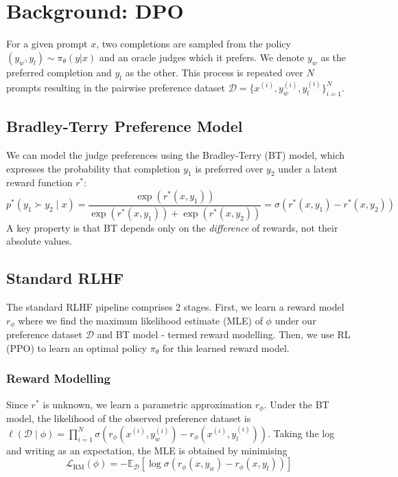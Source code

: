 \documentclass[11pt]{article}
\begin{document}
\section{Background: DPO}

For a given prompt $x$, two completions are sampled from the policy $(y_{w}, y_{l}) \sim \pi_{\theta}(y | x)$ and an oracle judges which it prefers. We denote $y_{w}$ as the preferred completion and $y_{l}$ as the other. This process is repeated over $N$ prompts resulting in the pairwise preference dataset $\mathcal{D} = \{x^{(i)}, y_{w}^{(i)}, y_{l}^{(i)}\}_{i=1}^{N}$.

\subsection{Bradley-Terry Preference Model}
We can model the judge preferences using the Bradley-Terry (BT) model, which expresses the probability that completion $y_1$ is preferred over $y_2$ under a latent reward function $r^*$:
$$
    p^*(y_1 \succ y_2 \mid x) = \frac{\exp\left(r^*(x, y_1)\right)}{\exp\left(r^*(x, y_1)\right) + \exp\left(r^*(x, y_2)\right)} = \sigma\!\left(r^*(x, y_1) - r^*(x, y_2)\right)
$$
A key property is that BT depends only on the \textit{difference} of rewards, not their absolute values.

\subsection{Standard RLHF}

The standard RLHF pipeline comprises 2 stages. First, we learn a reward model $r_\phi$ where we find the maximum likelihood estimate (MLE) of $\phi$ under our preference dataset $\mathcal{D}$ and BT model - termed reward modelling. Then, we use RL (PPO) to learn an optimal policy $\pi_\theta$ for this learned reward model.

\subsubsection{Reward Modelling}
Since $r^*$ is unknown, we learn a parametric approximation $r_\phi$. Under the BT model, the likelihood of the observed preference dataset is $\ell(\mathcal{D} \mid \phi) = \prod_{i=1}^{N} \sigma\!\left(r_\phi(x^{(i)}, y_w^{(i)}) - r_\phi(x^{(i)}, y_l^{(i)})\right)$. Taking the log and writing as an expectation, the MLE is obtained by minimising
\begin{equation}
    \mathcal{L}_{\text{RM}}(\phi) = - \mathbb{E}_{\mathcal{D}} \left[\log \sigma\!\left(r_{\phi}(x, y_{w}) - r_{\phi}(x, y_{l})\right)\right]
    \label{eq:reward-model-objective}
\end{equation}
\end{document}
